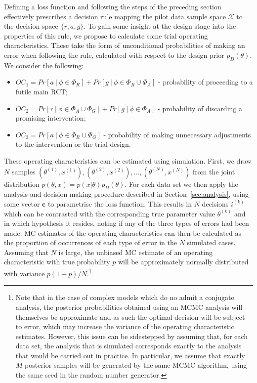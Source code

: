 \documentclass[AMA,STIX1COL]{WileyNJD-v2}
\begin{document}
Defining a loss function and following the steps of the preceding section effectively prescribes a decision rule mapping the pilot data sample space $\mathcal{X}$ to the decision space $\{r, a, g\}$. To gain some insight at the design stage into the properties of this rule, we propose to calculate some trial operating characteristics. These take the form of unconditional probabilities of making an error when following the rule, calculated with respect to the design prior $p_D(\theta)$. We consider the following:
\begin{itemize}
\item $OC_1 = Pr[a ~|~ \phi \in \Phi_R] + Pr[g ~|~ \phi \in \Phi_R \cup \Phi_A]$ - probability of proceeding to a futile main RCT;
\item $OC_2 = Pr[r ~|~ \phi \in \Phi_A \cup \Phi_G] + Pr[g ~|~ \phi \in \Phi_A]$ - probability of discarding a promising intervention;
\item $OC_3 = Pr[a ~|~ \phi \in \Phi_R \cup \Phi_G]$ - probability of making unnecessary adjustments to the intervention or the trial design.
\end{itemize}

These operating characteristics can be estimated using simulation. First, we draw $N$ samples $(\theta^{(1)}, x^{(1)}), (\theta^{(2)}, x^{(2)}), \ldots , (\theta^{(N)}, x^{(N)})$ from the joint distribution $p(\theta, x) = p(x | \theta)p_D(\theta)$. For each data set we then apply the analysis and decision making procedure described in Section~\ref{sec:analysis}, using some vector $\mathbf{c}$ to parametrise the loss function. This results in $N$ decisions $i^{(k)}$ which can be contrasted with the corresponding true parameter value $\theta^{(k)}$ and in which hypothesis it resides, noting if any of the three types of errors had been made. MC estimates of the operating characteristics can then be calculated as the proportion of occurrences of each type of error in the $N$ simulated cases. Assuming that $N$ is large, the unbiased MC estimate of an operating characteristic with true probability $p$ will be approximately normally distributed with variance $p(1-p)/N$.\footnote{Note that in the case of complex models which do no admit a conjugate analysis, the posterior probabilities obtained using an MCMC analysis will themselves be approximate and as such the optimal decision will be subject to error, which may increase the variance of the operating characteristic estimates. However, this issue can be sidestepped by assuming that, for each data set, the analysis that is simulated corresponds exactly to the analysis that would be carried out in practice. In particular, we assume that exactly $M$ posterior samples will be generated by the same MCMC algorithm, using the same seed in the random number generator.}
\end{document}
